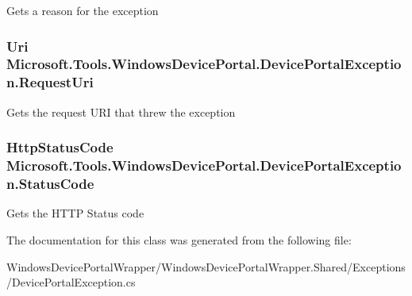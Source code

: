 Gets a reason for the exception 

\subsubsection[{\texorpdfstring{Request\+Uri}{RequestUri}}]{\setlength{\rightskip}{0pt plus 5cm}Uri Microsoft.\+Tools.\+Windows\+Device\+Portal.\+Device\+Portal\+Exception.\+Request\+Uri\hspace{0.3cm}{\ttfamily [get]}}\hypertarget{class_microsoft_1_1_tools_1_1_windows_device_portal_1_1_device_portal_exception_a4e412f713f6bf7ab1c1470bcd44ebed0}{}\label{class_microsoft_1_1_tools_1_1_windows_device_portal_1_1_device_portal_exception_a4e412f713f6bf7ab1c1470bcd44ebed0}


Gets the request U\+RI that threw the exception 

\subsubsection[{\texorpdfstring{Status\+Code}{StatusCode}}]{\setlength{\rightskip}{0pt plus 5cm}Http\+Status\+Code Microsoft.\+Tools.\+Windows\+Device\+Portal.\+Device\+Portal\+Exception.\+Status\+Code\hspace{0.3cm}{\ttfamily [get]}}\hypertarget{class_microsoft_1_1_tools_1_1_windows_device_portal_1_1_device_portal_exception_a64e7631aca6587a35db99e8e3cee2da9}{}\label{class_microsoft_1_1_tools_1_1_windows_device_portal_1_1_device_portal_exception_a64e7631aca6587a35db99e8e3cee2da9}


Gets the H\+T\+TP Status code 



The documentation for this class was generated from the following file\+:\begin{DoxyCompactItemize}
\item 
Windows\+Device\+Portal\+Wrapper/\+Windows\+Device\+Portal\+Wrapper.\+Shared/\+Exceptions/Device\+Portal\+Exception.\+cs\end{DoxyCompactItemize}
